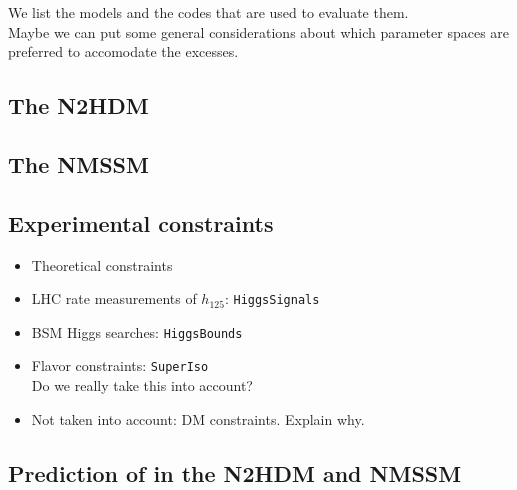 \documentclass[12pt]{article}
\begin{document}
\noindent
We list the models and the codes that are used to evaluate them.\\
Maybe we can put some general considerations about which parameter
spaces are preferred to accomodate the excesses.




\subsection{The N2HDM}
\label{sec:n2hdm}



\subsection{The NMSSM}
\label{sec:nmssm}



\subsection{Experimental constraints}
\label{sec:constraints}

\begin{itemize}

\item
Theoretical constraints

\item
LHC rate measurements of $h_{125}$: \texttt{HiggsSignals}

\item
BSM Higgs searches: \texttt{HiggsBounds}

\item
Flavor constraints: \texttt{SuperIso}\\
Do we really take this into account?


\item
Not taken into account: DM constraints. Explain why.

\end{itemize}



\subsection{Prediction of  in the N2HDM and NMSSM}
\end{document}
